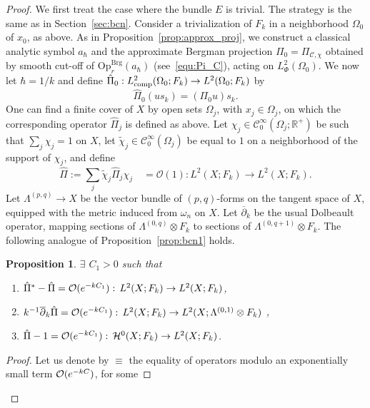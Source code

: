 \documentclass{article}
\newtheorem{prop}[theo]{Proposition}
\newcommand{\Op}{\mathrm{Op}}
\newcommand{\Brg}{\mathrm{Brg}}
\newcommand{\Opbrg}{\Op^{\Brg}}
\newcommand{\lphi}{L^2_\Phi}
\newcommand{\dbar}{\overline\partial}
\newcommand{\Cinf}{\mathscr{C}^\infty}
\newcommand{\RM}{\mathbb{R}}
\renewcommand{\O}{\mathcal{O}}
\newcommand{\h}{\hbar}
\begin{document}
\begin{proof}
  We first treat the case where the bundle $E$ is trivial.  The
  strategy is the same as in Section~\ref{sec:bcn}.  Consider a
  trivialization of $F_k$ in a neighborhood $\Omega_0$ of $x_0$, as
  above.  As in Proposition~\ref{prop:approx_proj}, we construct a
  classical analytic symbol $a_\h$ and the approximate Bergman
  projection $\Pi_{0}=\Pi_{\mathcal{C},\chi}$ obtained by smooth
  cut-off of $\Opbrg_r(a_\h)$ (see~\eqref{equ:Pi_C}), acting on
  $\lphi(\Omega_0)$. We now let $\h=1/k$ and define
  $\hat\Pi_{0}:L^2_{\textup{comp}}(\Omega_0;F_k)\to L^2(\Omega_0;F_k)$
  by
  \[
  \hat\Pi_{0} (u s_k) = (\Pi_{0} u) s_k.
  \]
  One can find a finite cover of $X$ by open sets $\Omega_j$, with
  $x_j\in \Omega_j$, on which the corresponding operator
  $\hat \Pi_{j}$ is defined as above. Let
  $\chi_j\in\Cinf_0(\Omega_j;\RM^+)$ be such that $\sum_j \chi_j = 1$
  on $X$, let $\tilde\chi_j\in\Cinf_0(\Omega_j)$ be equal to $1$ on a
  neighborhood of the support of $\chi_j$, and define
  \begin{equation}
    \label{equ:Pi-fibre}
    \hat\Pi := \sum_{j} \tilde\chi_j \hat \Pi_{j} \chi_j \quad
    = \O(1) : L^2(X;F_k) \to L^2(X; F_k).
  \end{equation}
  Let $\Lambda^{(p,q)}\to X$ be the vector bundle of $(p,q)$-forms on
  the tangent space of $X$, equipped with the metric induced from
  $\omega_n$ on $X$. Let $\dbar_k$ be the usual Dolbeault operator,
  mapping sections of $\Lambda^{(0,q)} \otimes F_k$ to sections of
  $\Lambda^{(0,q+1)} \otimes F_k$.  The following analogue of
  Proposition~\ref{prop:bcn1} holds.
  \begin{prop}
    \label{prop:fibre2}
    $\exists$ $C_1>0$ such that
    \begin{enumerate}[label=\roman*)]
    \item \label{item:propfibre-autoadj}
      $\hat\Pi^* - \hat\Pi = {\cal O}(e^{-kC_1}):\, L^2(X;F_k)\to
      L^2(X;F_k)$,
    \item \label{item:propfibre-holo}
      $k^{-1}\dbar_k\hat\Pi={\cal O}(e^{-kC_1}):\, L^2(X;F_k)\to
      L^2(X;\Lambda^{(0,1)} \otimes F_k)$ ,
    \item \label{item:propfibre-repro}
      $\hat\Pi-1={\cal O}(e^{-kC_1}):\, \mathcal{H}^0(X;F_k)\to
      L^2(X;F_k)$.
    \end{enumerate}
  \end{prop}
  \begin{proof} Let us denote by $\equiv$ the equality of operators
    modulo an exponentially small term ${\cal O}(e^{-kC})$, for some

\end{proof}
\end{proof}
\end{document}
